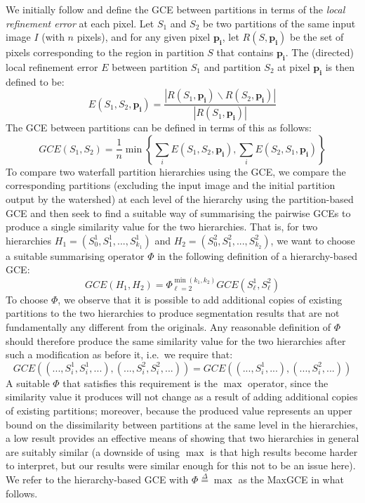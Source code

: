 \documentclass[preprint,a4paper]{elsarticle}
\newcommand{\eqdef}{\stackrel{\Delta}{=}}
\begin{document}
We initially follow \cite{martin01} and define the GCE between partitions in terms of the \emph{local refinement error} at each pixel. Let $S_1$ and $S_2$ be two partitions of the same input image $I$ (with $n$ pixels), and for any given pixel $\mathbf{p_i}$, let $R(S,\mathbf{p_i})$ be the set of pixels corresponding to the region in partition $S$ that contains $\mathbf{p_i}$. The (directed) local refinement error $E$ between partition $S_1$ and partition $S_2$ at pixel $\mathbf{p_i}$ is then defined to be:
%
\[
E(S_1,S_2,\mathbf{p_i}) = \frac{|R(S_1,\mathbf{p_i}) \backslash R(S_2,\mathbf{p_i})|}{|R(S_1,\mathbf{p_i})|}
\]
%
The GCE between partitions can be defined in terms of this as follows:
%
\[
GCE(S_1,S_2) = \frac{1}{n} \min \left\{ \sum_i E(S_1,S_2,\mathbf{p_i}), \sum_i E(S_2,S_1,\mathbf{p_i}) \right\}
\]
%
To compare two waterfall partition hierarchies using the GCE, we compare the corresponding partitions (excluding the input image and the initial partition output by the watershed) at each level of the hierarchy using the partition-based GCE and then seek to find a suitable way of summarising the pairwise GCEs to produce a single similarity value for the two hierarchies. That is, for two hierarchies $H_1 = (S_0^1,S_1^1,...,S_{k_1}^1)$ and $H_2 = (S_0^2,S_1^2,...,S_{k_2}^2)$, we want to choose a suitable summarising operator $\Phi$ in the following definition of a hierarchy-based GCE:
%
\[
GCE(H_1,H_2) = \Phi_{\ell=2}^{\min(k_1,k_2)} GCE(S_\ell^1,S_\ell^2)
\]
%
To choose $\Phi$, we observe that it is possible to add additional copies of existing partitions to the two hierarchies to produce segmentation results that are not fundamentally any different from the originals. Any reasonable definition of $\Phi$ should therefore produce the same similarity value for the two hierarchies after such a modification as before it, i.e.~we require that:
%
\[
GCE((...,S_i^1,S_i^1,...),(...,S_i^2,S_i^2,...)) = GCE((...,S_i^1,...),(...,S_i^2,...))
\]
%
A suitable $\Phi$ that satisfies this requirement is the $\max$ operator, since the similarity value it produces will not change as a result of adding additional copies of existing partitions; moreover, because the produced value represents an upper bound on the dissimilarity between partitions at the same level in the hierarchies, a low result provides an effective means of showing that two hierarchies in general are suitably similar (a downside of using $\max$ is that high results become harder to interpret, but our results were similar enough for this not to be an issue here). We refer to the hierarchy-based GCE with $\Phi \eqdef \max$ as the MaxGCE in what follows.
\end{document}
